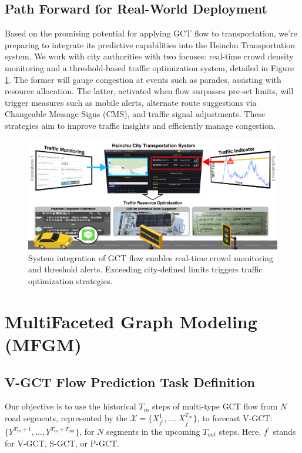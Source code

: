 \documentclass[letterpaper]{article} %
\begin{document}
\subsection{Path Forward for Real-World Deployment}
Based on the promising potential for applying GCT flow to transportation, we're preparing to integrate its predictive capabilities into the Hsinchu Transportation system. We work with city authorities with two focuses: real-time crowd density monitoring and a threshold-based traffic optimization system, detailed in Figure \ref{fig:applications}. The former will gauge congestion at events such as parades, assisting with resource allocation. The latter, activated when flow surpasses pre-set limits, will trigger measures such as mobile alerts, alternate route suggestions via Changeable Message Signs (CMS), and traffic signal adjustments. These strategies aim to improve traffic insights and efficiently manage congestion.
\begin{figure}[ht]
\centering
\includegraphics[width=0.95\linewidth]{Figure/gct_applications.png}
\caption{System integration of GCT flow enables real-time crowd monitoring and threshold alerts. Exceeding city-defined limits triggers traffic optimization strategies.}
\label{fig:applications}
\end{figure}

\clearpage

\section{MultiFaceted Graph Modeling (MFGM)}

\subsection{V-GCT Flow Prediction Task Definition} 
Our objective is to use the historical $T_{in}$ steps of multi-type GCT flow from $N$ road segments, represented by the $\mathcal{X}=\{X_{f^{'}}^{1},...,X_{f^{'}}^{T_{in}}\}$, to forecast V-GCT: $\{{Y}^{T_{in}+1},...,{Y}^{T_{in}+T_{out}}\}$, for $N$ segments in the upcoming $T_{out}$ steps. Here, $f^{'}$ stands for V-GCT, S-GCT, or P-GCT.
\end{document}
